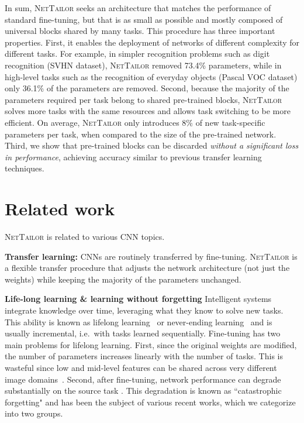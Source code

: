 \documentclass[10pt,twocolumn,letterpaper]{article}
\begin{document}
In sum, \textsc{NetTailor} seeks an architecture that matches the performance of standard fine-tuning, but that is as small as possible and mostly composed of universal blocks shared by many tasks. This procedure has three important properties. 
First, it enables the deployment of networks of different complexity for different tasks. 
For example, in simpler recognition problems such as digit recognition (SVHN dataset), \textsc{NetTailor} removed 73.4\% parameters, while in high-level tasks such as the recognition of everyday objects (Pascal VOC dataset) only 36.1\% of the parameters are removed.
Second, because the majority of the parameters required per task belong to shared pre-trained blocks, \textsc{NetTailor} solves more tasks with the same resources and allows task switching to be more efficient. 
On average, \textsc{NetTailor} only introduces 8\% of new task-specific parameters per task, when compared to the size of the pre-trained network.
Third, we show that pre-trained blocks can be discarded \textit{without a significant loss in performance}, achieving accuracy similar to previous transfer learning techniques.























 
\vspace{-3pt}
\section{Related work}
\vspace{-3pt}


\textsc{NetTailor} is related to various CNN topics.

\noindent
{\bf Transfer learning:} CNNs are routinely transferred by fine-tuning. 
\textsc{NetTailor} is a flexible transfer procedure that adjusts the network architecture (not just the weights) while keeping the majority of the parameters unchanged.

\noindent
{\bf Life-long learning \& learning without forgetting}
Intelligent systems integrate knowledge over time, leveraging what they know to solve new tasks. This ability is known as lifelong learning~\cite{thrun1995lifelong} or never-ending learning~\cite{mitchell2018never} and is usually incremental, i.e.~with tasks learned sequentially. 
Fine-tuning has two main problems for lifelong learning. First, since the original weights are modified, the number of parameters increases linearly with the number of tasks. This is wasteful since low and mid-level features can be shared across very different image domains~\cite{sharif2014cnn}. 
Second, after fine-tuning, network performance can degrade substantially on the source task \cite{goodfellow2013empirical}. 
This degradation is known as ``catastrophic forgetting" and has been the subject of various recent works, which we categorize into two groups.
\end{document}
